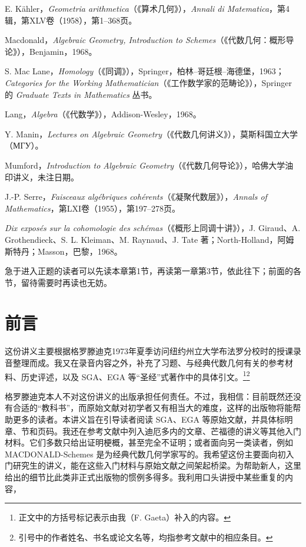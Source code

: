 \begin{description}[style=nextline,leftmargin=1.5em]
\item[KÄHLER]
E. Kähler，\textit{Geometria arithmetica}（《算术几何》），\textit{Annali di Matematica}，第4辑，第XLV卷（1958），第1--368页。
\item[MACDONALD-Schemes]
Macdonald，\textit{Algebraic Geometry, Introduction to Schemes}（《代数几何：概形导论》），Benjamin，1968。
\item[MACLANE-Homology；MACLANE-Category text]
S. Mac Lane，\textit{Homology}（《同调》），Springer，柏林--哥廷根--海德堡，1963；\textit{Categories for the Working Mathematician}（《工作数学家的范畴论》），Springer 的 \textit{Graduate Texts in Mathematics} 丛书。
\item[LANG]
Lang，\textit{Algebra}（《代数学》），Addison-Wesley，1968。
\item[MANIN-（{\cyrillicfont МГУ}）]
Y. Manin，\textit{Lectures on Algebraic Geometry}（《代数几何讲义》），莫斯科国立大学（{\cyrillicfont МГУ}）。
\item[MUMFORD]
Mumford，\textit{Introduction to Algebraic Geometry}（《代数几何导论》），哈佛大学油印讲义，未注日期。
\item[FAC]
J.-P. Serre，\textit{Faisceaux algébriques cohérents}（《凝聚代数层》），\textit{Annals of Mathematics}，第LXI卷（1955），第197--278页。
\item[COH-SCHEMES]
\textit{Dix exposés sur la cohomologie des schémas}（《概形上同调十讲》），J. Giraud、A. Grothendieck、S. L. Kleiman、M. Raynaud、J. Tate 著；North-Holland，阿姆斯特丹；Masson，巴黎，1968。
\end{description}

急于进入正题的读者可以先读本章第1节，再读第一章第3节，依此往下；前面的各节，留待需要时再读也无妨。

\section*{前言}
这份讲义主要根据格罗滕迪克1973年夏季访问纽约州立大学布法罗分校时的授课录音整理而成。我又在录音内容之外，补充了习题、与经典代数几何有关的参考材料、历史评述，以及 SGA、EGA 等“圣经”式著作中的具体引文。\footnote{正文中的方括号标记表示由我（F. Gaeta）补入的内容。}\footnote{引号中的作者姓名、书名或论文名等，均指参考文献中的相应条目。}

格罗滕迪克本人不对这份讲义的出版承担任何责任。不过，我相信：目前既然还没有合适的“教科书”，而原始文献对初学者又有相当大的难度，这样的出版物将能帮助更多的读者。本讲义旨在引导读者阅读 SGA、EGA 等原始文献，并具体标明章、节和页码。我还在参考文献中列入迪厄多内的文章、芒福德的讲义等其他入门材料。它们多数只给出证明梗概，甚至完全不证明；或者面向另一类读者，例如 MACDONALD-Schemes 是为经典代数几何学家写的。我希望这份主要面向初入门研究生的讲义，能在这些入门材料与原始文献之间架起桥梁。为帮助新人，这里给出的细节比此类非正式出版物的惯例多得多。我利用口头讲授中某些重复的内容，

